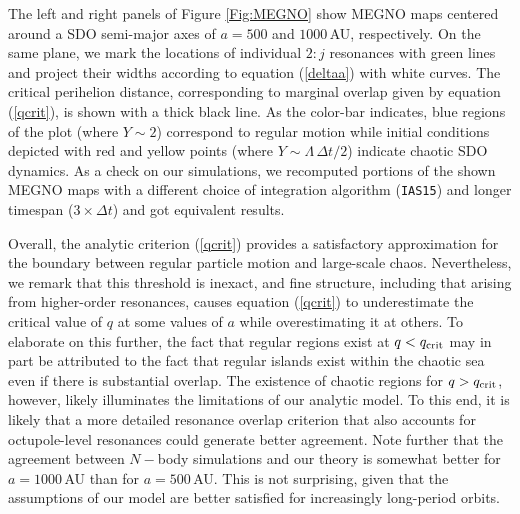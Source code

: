 \documentclass[twocolumn]{aastex62}
\begin{document}
The left and right panels of Figure \ref{Fig:MEGNO} show MEGNO maps centered around a SDO semi-major axes of $a=500$ and $1000\,$AU, respectively. On the same plane, we mark the locations of individual $2:j$ resonances with green lines and project their widths according to equation (\ref{deltaa}) with white curves. The critical perihelion distance, corresponding to marginal overlap given by equation (\ref{qcrit}), is shown with a thick black line. As the color-bar indicates, blue regions of the plot (where $Y\sim2$) correspond to regular motion while initial conditions depicted with red and yellow points (where $Y\sim\Lambda\,\Delta t/2$) indicate chaotic SDO dynamics. As a check on our simulations, we recomputed portions of the shown MEGNO maps with a different choice of integration algorithm (\texttt{IAS15}) and longer timespan ($3\times\Delta t$) and got equivalent results.

Overall, the analytic criterion (\ref{qcrit}) provides a satisfactory approximation for the boundary between regular particle motion and large-scale chaos. Nevertheless, we remark that this threshold is inexact, and fine structure, including that arising from higher-order resonances, causes equation (\ref{qcrit}) to underestimate the critical value of $q$ at some values of $a$ while overestimating it at others. To elaborate on this further, the fact that regular regions exist at $q<q_{\rm{crit}}$ may in part be attributed to the fact that regular islands exist within the chaotic sea even if there is substantial overlap. The existence of chaotic regions for $q>q_{\rm{crit}}$, however, likely illuminates the limitations of our analytic model. To this end, it is likely that a more detailed resonance overlap criterion that also accounts for octupole-level resonances could generate better agreement. Note further that the agreement between $N-$body simulations and our theory is somewhat better for $a=1000\,$AU than for $a=500\,$AU. This is not surprising, given that the assumptions of our model are better satisfied for increasingly long-period orbits.  

\end{document}
